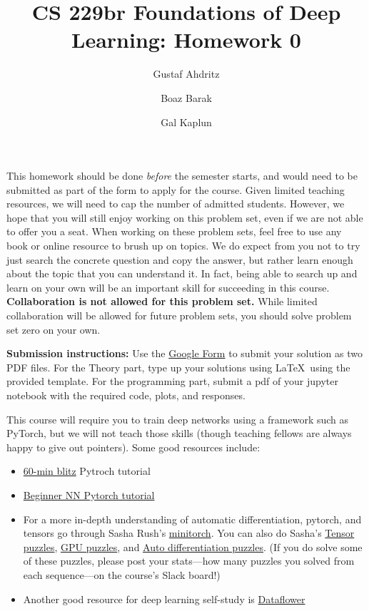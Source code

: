 \documentclass{article}
\title{CS 229br Foundations of Deep Learning: Homework 0}
\author{Gustaf Ahdritz \and Boaz Barak \and Gal Kaplun}
\theoremstyle{definition}
\begin{document}
\date{}
\maketitle{}

This homework should be done \emph{before} the semester starts, and would need to be submitted as part of the form to apply for the course. Given limited teaching resources, we will need to cap the number of admitted students. However, we hope that you will still enjoy working on this problem set, even if we are not able to offer you a seat. When working on these problem sets, feel free to use any book or online resource to brush up on topics. We do expect from you not to try just search the concrete question and copy the answer, but rather learn enough about the topic that you can understand it. In fact, being able to search up and learn on your own will be an important skill for succeeding in this course. \textbf{Collaboration is not allowed for this problem set.} While limited collaboration will be allowed for future problem sets, you should solve problem set zero on your own. 

\medskip 
{\color{red} \textbf{Submission instructions:} Use the \href{https://forms.gle/gjXbdCVbqxRVu6Bj6}{Google Form} to submit your solution as two PDF files. For the Theory part, type up your solutions using \LaTeX\ using the provided template. For the programming part, submit a pdf of your jupyter notebook with the required code, plots, and responses.}

\medskip
This course will require you to train deep networks using a framework such as PyTorch, but we will not teach those skills (though teaching fellows are always happy to give out pointers).  Some good resources include:


\begin{itemize}
    \item \href{https://pytorch.org/tutorials/beginner/deep_learning_60min_blitz.html}{60-min blitz} Pytroch tutorial
    \item \href{https://pytorch.org/tutorials/beginner/nn_tutorial.html}{Beginner NN Pytorch tutorial}

    \item For a more in-depth understanding of automatic differentiation, pytorch, and tensors go through Sasha Rush's \href{https://minitorch.github.io/}{minitorch}. You can also do Sasha's \href{https://github.com/srush/Tensor-Puzzles}{Tensor puzzles},  \href{https://github.com/srush/GPU-Puzzles}{GPU puzzles}, and \href{https://github.com/srush/Autodiff-Puzzles}{Auto differentiation puzzles}. (If you do solve some of these puzzles, please post your stats---how many puzzles you solved from each sequence---on the course's Slack board!)

    \item Another good  resource for deep learning self-study is \href{https://dataflowr.github.io/website/}{Dataflower}
    
\end{itemize}
\end{document}
